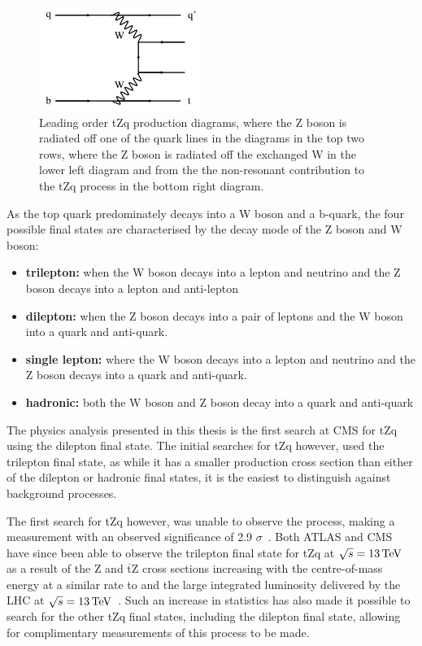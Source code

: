 \begin{figure}[htbp]
\includegraphics[width=0.47\textwidth]{figs/top-physics/tZq_feyn6.jpg}
\caption{Leading order tZq production diagrams, where the Z boson is radiated off one of the quark lines in the diagrams in the top two rows, where the Z boson is radiated off the exchanged W in the lower left diagram and from the the non-resonant contribution to the tZq process in the bottom right diagram.}
\label{fig:feyn_tZq}
\end{figure}

As the top quark predominately decays into a W boson and a b-quark, the four possible final states are characterised by the decay mode of the Z boson and W boson:
\begin{itemize}
\item \textbf{trilepton:} when the W boson decays into a lepton and neutrino and the Z boson decays into a lepton and anti-lepton
\item \textbf{dilepton:} when the Z boson decays into a pair of leptons and the W boson into a quark and anti-quark. 
\item \textbf{single lepton:} where the W boson decays into a lepton and neutrino and the Z boson decays into a quark and anti-quark.
\item \textbf{hadronic:} both the W boson and Z boson decay into a quark and anti-quark
\end{itemize}

The physics analysis presented in this thesis is the first search at CMS for tZq using the dilepton final state.
The initial searches for tZq however, used the trilepton final state, as while it has a smaller production cross section than either of the dilepton or hadronic final states, it is the easiest to distinguish against background processes.

The first search for tZq however, was unable to observe the process, making a measurement with an observed significance of 2.9 $\sigma$~\cite{Sirunyan:2017kkr}.
Both ATLAS and CMS have since been able to observe the trilepton final state for tZq at $\sqrt{s} = 13\,\text{Te\hspace{-.08em}V}$ as a result of the Z and $\overline{\text{t}}$Z cross sections increasing with the centre-of-mass energy at a similar rate to \ttZ and the large integrated luminosity delivered by the LHC at $\sqrt{s} = 13\,\text{Te\hspace{-.08em}V}$~\cite{Aaboud:2017ylb,Sirunyan:2017nbr}.
Such an increase in statistics has also made it possible to search for the other tZq final states, including the dilepton final state, allowing for complimentary measurements of this process to be made.


